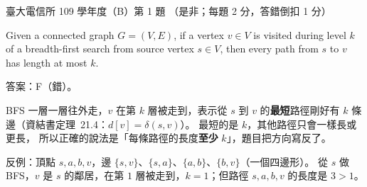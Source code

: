 \begin{pastexam}[label={px:ntu-109-comm-dsa-01}]{臺大電信所 109 學年度（B）第 1 題}
（是非；每題 2 分，答錯倒扣 1 分）

Given a connected graph $G=(V,E)$, if a vertex $v\in V$ is visited during level $k$ of a
breadth-first search from source vertex $s\in V$, then every path from $s$ to $v$ has length at
most $k$.
\end{pastexam}

\begin{pastsoln}
答案：F（錯）。

BFS 一層一層往外走，$v$ 在第 $k$ 層被走到，表示從 $s$ 到 $v$ 的\textbf{最短}路徑剛好有 $k$
條邊（資結書定理~21.4：$d[v] = \delta(s, v)$）。 最短的是 $k$，其他路徑只會一樣長或更長，
所以正確的說法是「每條路徑的長度\textbf{至少} $k$」，題目把方向寫反了。

反例：頂點 $s, a, b, v$，邊 $\{s, v\}$、$\{s, a\}$、$\{a, b\}$、$\{b, v\}$（一個四邊形）。
從 $s$ 做 BFS，$v$ 是 $s$ 的鄰居，在第 $1$ 層被走到，$k = 1$；但路徑 $s, a, b, v$ 的長度是
$3 > 1$。
\end{pastsoln}
